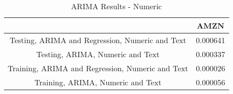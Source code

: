 \begin{table}[!h]
\caption{ARIMA Results - Numeric}
 \label{ARIMA Results - Numeric}
\captionsetup{justification=centering} 
 \begin{center}\begin{tabular}{|c|c|}\hline
{} &      AMZN \\ \hline
Testing, ARIMA and Regression, Numeric and Text  &  0.000641 \\ \hline
Testing, ARIMA, Numeric and Text                 &  0.000337 \\ \hline
Training, ARIMA and Regression, Numeric and Text &  0.000026 \\ \hline
Training, ARIMA, Numeric and Text                &  0.000056 \\ \hline
\end{tabular}
 \end{center}
\end{table}